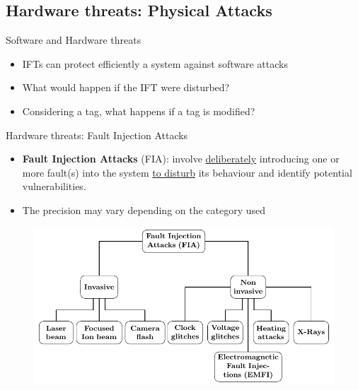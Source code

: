 \subsection{Hardware threats: Physical Attacks}
\begin{frame}{Software and Hardware threats}
    \begin{block}{}
        \begin{itemize}
            [square]
            \justifying
            \item IFTs can protect efficiently a system against software attacks
            \item What would happen if the IFT were disturbed?
            \item Considering a tag, what happens if a tag is modified?
        \end{itemize}
    \end{block}
\end{frame}

\begin{frame}{Hardware threats: Fault Injection Attacks}
    \begin{minipage}[c]{0.5\textwidth}
        \begin{block}{}
            \begin{itemize}
                [square]
                \justifying
                \item \textbf{Fault Injection Attacks} (FIA): involve \underline{deliberately} introducing one or more fault(s) into the system \underline{to disturb} its behaviour and identify potential vulnerabilities.
                \item The precision may vary depending on the category used
            \end{itemize}
        \end{block}
        \end{minipage}\hfill%
    \begin{minipage}[c]{0.5\textwidth}
        \begin{figure}
            \centering
            \includegraphics[height=.75\textheight, page=2]{src/1_introduction/img/physicalAttacks.pdf}
            \label{fig:fia}
        \end{figure}
    \end{minipage}
\end{frame}
